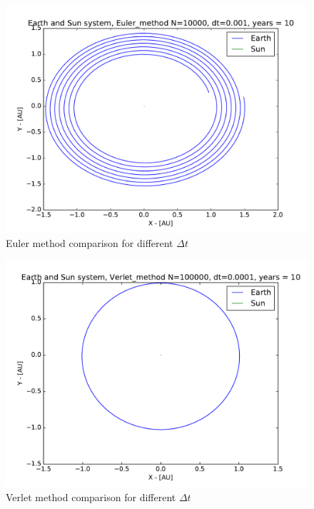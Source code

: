 \documentclass[12pt]{article}
\begin{document}
\begin{figure}[!h]
\centering
\includegraphics[width=\linewidth]{Plots/Earth_Sun_Euler_method_larger_dt.pdf}
\caption{Euler method comparison for different $\Delta t$}
\label{fig:balle1}
\end{figure}

\begin{figure}[!h]
\centering
\includegraphics[width=\linewidth]{Plots/Earth_Sun_Verlet_method.pdf}
\caption{Verlet method comparison for different $\Delta t$}
\label{fig:balle2}
\end{figure}
\end{document}
